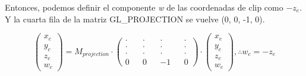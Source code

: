 Entonces, podemos definir el componente \textit{w} de las coordenadas de clip como $-z_e$. Y la cuarta fila de la matriz GL\_PROJECTION se vuelve (0, 0, -1, 0).


\begin{figure} [h]
  \centering
  \[
  \begin{pmatrix}
    x_{c} \\ y_{c} \\ z_{c} \\ w_{c}
  \end{pmatrix}
  =
  M_{projection} \cdot
  \begin{pmatrix}
    \cdot && \cdot && \cdot && \cdot \\
    \cdot && \cdot && \cdot && \cdot \\
    \cdot && \cdot && \cdot && \cdot \\
        0 &&     0 &&    -1 &&     0
  \end{pmatrix} \cdot
  \begin{pmatrix}
    x_{e} \\ y_{e} \\ z_{e} \\ w_{e}
  \end{pmatrix}
  ,  \therefore w_c = -z_e
  \]
\end{figure}
